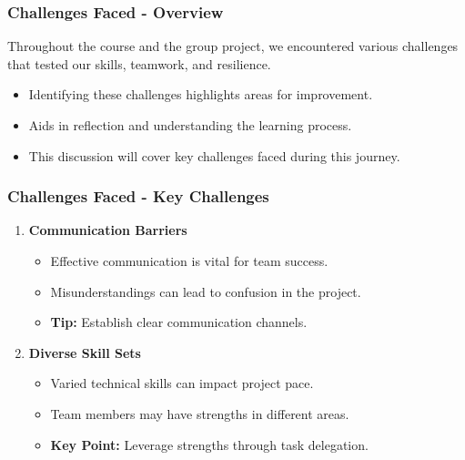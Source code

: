 \documentclass[aspectratio=169]{beamer}
\begin{document}
\begin{frame}[fragile]
    \frametitle{Challenges Faced - Overview}
    Throughout the course and the group project, we encountered various challenges that tested our skills, teamwork, and resilience. 
    \begin{itemize}
        \item Identifying these challenges highlights areas for improvement.
        \item Aids in reflection and understanding the learning process.
        \item This discussion will cover key challenges faced during this journey.
    \end{itemize}
\end{frame}

\begin{frame}[fragile]
    \frametitle{Challenges Faced - Key Challenges}
    \begin{enumerate}
        \item \textbf{Communication Barriers}
            \begin{itemize}
                \item Effective communication is vital for team success.
                \item Misunderstandings can lead to confusion in the project.
                \item \textbf{Tip:} Establish clear communication channels.
            \end{itemize}

        \item \textbf{Diverse Skill Sets}
            \begin{itemize}
                \item Varied technical skills can impact project pace.
                \item Team members may have strengths in different areas.
                \item \textbf{Key Point:} Leverage strengths through task delegation.
            \end{itemize}
    \end{enumerate}
\end{frame}
\end{document}
